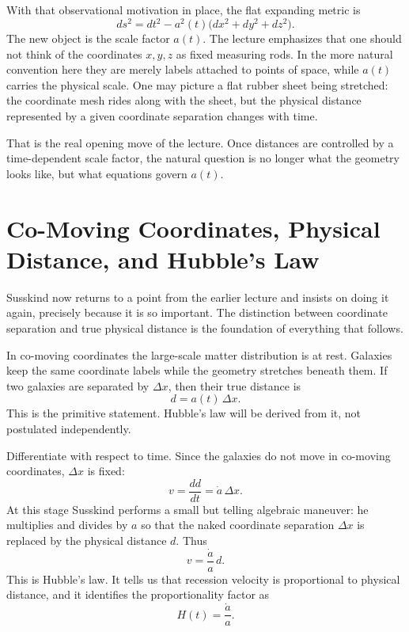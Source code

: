 With that observational motivation in place, the flat expanding metric is
\begin{equation}
ds^2 = dt^2 - a^2(t)\bigl(dx^2+dy^2+dz^2\bigr).
\end{equation}
The new object is the scale factor \(a(t)\). The lecture emphasizes that one should not think of the coordinates \(x,y,z\) as fixed measuring rods. In the more natural convention here they are merely labels attached to points of space, while \(a(t)\) carries the physical scale. One may picture a flat rubber sheet being stretched: the coordinate mesh rides along with the sheet, but the physical distance represented by a given coordinate separation changes with time.

That is the real opening move of the lecture. Once distances are controlled by a time-dependent scale factor, the natural question is no longer what the geometry looks like, but what equations govern \(a(t)\).

\section{Co-Moving Coordinates, Physical Distance, and Hubble's Law}

Susskind now returns to a point from the earlier lecture and insists on doing it again, precisely because it is so important. The distinction between coordinate separation and true physical distance is the foundation of everything that follows.

In co-moving coordinates the large-scale matter distribution is at rest. Galaxies keep the same coordinate labels while the geometry stretches beneath them. If two galaxies are separated by \(\Delta x\), then their true distance is
\begin{equation}
d = a(t)\,\Delta x.
\end{equation}
This is the primitive statement. Hubble's law will be derived from it, not postulated independently.

Differentiate with respect to time. Since the galaxies do not move in co-moving coordinates, \(\Delta x\) is fixed:
\begin{equation}
v = \frac{dd}{dt} = \dot a\,\Delta x.
\end{equation}
At this stage Susskind performs a small but telling algebraic maneuver: he multiplies and divides by \(a\) so that the naked coordinate separation \(\Delta x\) is replaced by the physical distance \(d\). Thus
\begin{equation}
v = \frac{\dot a}{a}\,d.
\end{equation}
This is Hubble's law. It tells us that recession velocity is proportional to physical distance, and it identifies the proportionality factor as
\begin{equation}
H(t)=\frac{\dot a}{a}.
\end{equation}


